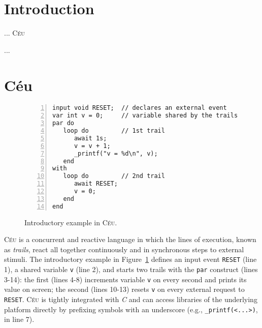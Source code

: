 \documentclass{acm_proc_article-sp}
\newcommand{\CEU}{\textsc{C\'{e}u}\xspace}
\newcommand{\code}[1] {{\small{\texttt{#1}}}}
\begin{document}



\section{Introduction}

\begin{comment}
Difficult because of
    multiple stack frames
    concurrent stack frames
    persistent stack frames (across reactions, with other parts executing)
    static memory management
    mutation of the data structure being traversed
\end{comment}

... \CEU~\cite{ceu.sensys13,ceu.mod15}

...

\newpage
\section{C\'eu}

\begin{comment}
\item adts
\item description
\item expansion: pool / recursive spawn
\item mutation / safety / watching
\end{comment}

\begin{figure}%
\begin{lstlisting}[numbers=left,xleftmargin=3em]
input void RESET;  // declares an external event
var int v = 0;     // variable shared by the trails
par do
   loop do         // 1st trail
      await 1s;
      v = v + 1;
      _printf("v = %d\n", v);
   end
with
   loop do         // 2nd trail
      await RESET;
      v = 0;
   end
end
\end{lstlisting}
\caption{ Introductory example in \CEU.
\label{lst.intro}
}
\end{figure}

\CEU is a concurrent and reactive language in which the lines of execution, 
known as \emph{trails}, react all together continuously and in synchronous 
steps to external stimuli.
The introductory example in Figure~\ref{lst.intro} defines an input event 
\code{RESET} (line 1), a shared variable \code{v} (line 2), and starts two 
trails with the \code{par} construct (lines 3-14): the first (lines 4-8) 
increments variable \code{v} on every second and prints its value on screen; 
the second (lines 10-13) resets \code{v} on every external request to 
\code{RESET}.
\CEU is tightly integrated with \emph{C} and can access libraries of the 
underlying platform directly by prefixing symbols with an underscore (e.g., 
\code{\_printf(<...>)}, in line 7).
\end{document}
